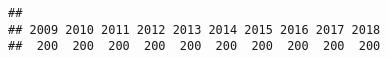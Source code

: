 \documentclass[]{article}
\newenvironment{Shaded}{\begin{snugshade}}{\end{snugshade}}
\newcommand{\DataTypeTok}[1]{\textcolor[rgb]{0.13,0.29,0.53}{#1}}
\newcommand{\KeywordTok}[1]{\textcolor[rgb]{0.13,0.29,0.53}{\textbf{#1}}}
\newcommand{\NormalTok}[1]{#1}
\newcommand{\OperatorTok}[1]{\textcolor[rgb]{0.81,0.36,0.00}{\textbf{#1}}}
\newcommand{\StringTok}[1]{\textcolor[rgb]{0.31,0.60,0.02}{#1}}
\begin{document}
\begin{Shaded}
\end{Shaded}

\begin{verbatim}
## 
## 2009 2010 2011 2012 2013 2014 2015 2016 2017 2018 
##  200  200  200  200  200  200  200  200  200  200
\end{verbatim}

\begin{Shaded}
\end{Shaded}
\end{document}
